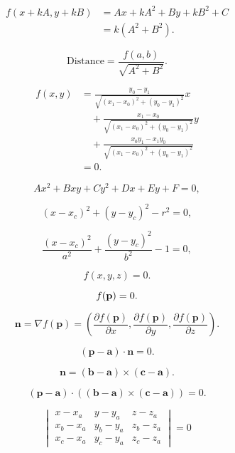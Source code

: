 \begin{equation}
  \begin{aligned}
    f(x+k A,y+k B) & =A x+k A^{2}+B y+k B^{2}+C \\
                   & =k(A^{2}+B^{2}).
  \end{aligned}
\end{equation}

\[
  \mathrm{Distance}={\frac{f(a,b)}{\sqrt{A^{2}+B^{2}}}}.
\]

\begin{equation}
  \begin{aligned}
    f(x,y) & ={\frac{y_{0}-y_{1}}{\sqrt{(x_{1}-x_{0})^{2}+(y_{0}-y_{1})^{2}}}}x               \\
           & \quad+{\frac{x_{1}-x_{0}}{\sqrt{(x_{1}-x_{0})^{2}+(y_{0}-y_{1})^{2}}}}y          \\
           & \quad+{\frac{x_{0}y_{1}-x_{1}y_{0}}{\sqrt{(x_{1}-x_{0})^{2}+(y_{0}-y_{1})^{2}}}} \\
           & =0.
  \end{aligned}
\end{equation}

\[
  A x^{2}+B x y+C y^{2}+D x+E y+F=0,
\]

\[
  (x-x_{c})^{2}+(y-y_{c})^{2}-r^{2}=0,
\]

\[
  {\frac{(x-x_{c})^{2}}{a^{2}}}+{\frac{(y-y_{c})^{2}}{b^{2}}}-1=0,
\]

\[
  f(x,y,z)=0.
\]

\[
  f({\bf p})=0.
\]

\[
  \mathbf{n}=\nabla f(\mathbf{p})=\left({\frac{\partial f(\mathbf{p})}{\partial x}},{\frac{\partial f(\mathbf{p})}{\partial y}},{\frac{\partial f(\mathbf{p})}{\partial z}}\right).
\]

\begin{equation}
  (\mathbf{p}-\mathbf{a})\cdot\mathbf{n}=0.
\end{equation}

\[
  \mathbf{n}=(\mathbf{b}-\mathbf{a})\times(\mathbf{c}-\mathbf{a}).
\]

\begin{equation}
  (\mathbf{p}-\mathbf{a})\cdot((\mathbf{b}-\mathbf{a})\times(\mathbf{c}-\mathbf{a}))=0.
\end{equation}

\begin{equation}
  \begin{vmatrix}
    x-x_a   & y-y_a   & z-z_a   \\
    x_b-x_a & y_b-y_a & z_b-z_a \\
    x_c-x_a & y_c-y_a & z_c-z_a
  \end{vmatrix}=0
\end{equation}

